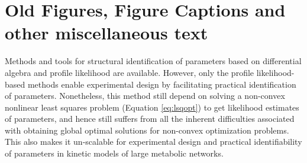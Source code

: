 \documentclass[10pt]{article}
\begin{document}
	\clearpage

	\section{Old Figures, Figure Captions and other miscellaneous text}	
	Methods and tools for structural identification of parameters based on differential algebra \parencite{Ljung1994, Audoly2001, Bellu2007} and profile likelihood \parencite{Raue2014} are available. However, only the profile likelihood-based methods enable experimental design by facilitating practical identification of parameters. Nonetheless, this method still depend on solving a non-convex nonlinear least squares problem (Equation \ref{eq:lsqopt}) to get likelihood estimates of parameters, and hence still suffers from all the inherent difficulties associated with obtaining global optimal solutions for non-convex optimization problems. This also makes it un-scalable for experimental design and practical identifiability of parameters in kinetic models of large metabolic networks.	
	
\end{document}
